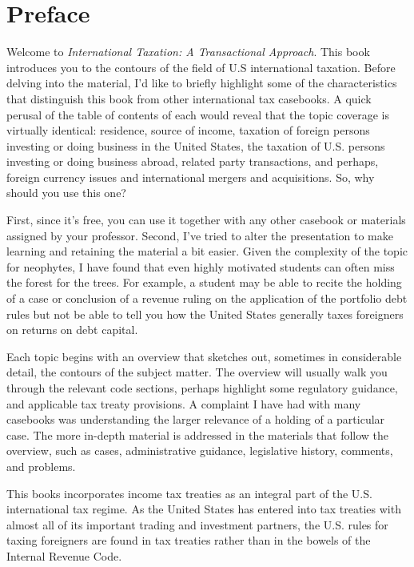 \chapter{Preface}

Welcome to \textit{International Taxation: A Transactional Approach}.  This book introduces you to the contours of the field of U.S international taxation.  Before delving into the material, I'd like to briefly highlight some of the characteristics that distinguish this book from other international tax casebooks.  A quick perusal of the table of contents of each would reveal that the topic coverage is virtually identical:  residence, source of income, taxation of foreign persons investing or doing business in the United States, the taxation of U.S. persons investing or doing business abroad, related party transactions, and perhaps, foreign currency issues and international mergers and acquisitions.  So, why should you use this one?  

First, since it's free, you can use it together with any other casebook  or materials assigned by your professor.  Second, I've tried to alter the presentation to make learning and retaining the material a bit easier.  Given the complexity of the topic for neophytes, I have found that even highly motivated students can often miss the forest for the trees.  For example, a student may be able to recite the holding of a case or conclusion of a revenue ruling on the application of the portfolio debt rules but not be able to tell you how the United States generally taxes foreigners on returns on debt capital.  

Each topic begins with an overview that sketches out, sometimes in considerable detail, the contours of the subject matter.  The overview will usually walk you through the relevant code sections, perhaps highlight some regulatory guidance, and applicable tax treaty provisions.  A complaint I have had with many casebooks was understanding the larger relevance of a holding of a particular case.  The more in-depth material is addressed in the materials that follow the overview, such as cases, administrative guidance, legislative history, comments, and problems.  

This books incorporates income tax treaties as an integral part of the U.S. international tax regime.  As the United States has entered into tax treaties with almost all of its important  trading and investment partners, the U.S. rules for taxing foreigners are found in tax treaties rather than in the bowels of the Internal Revenue Code.  

